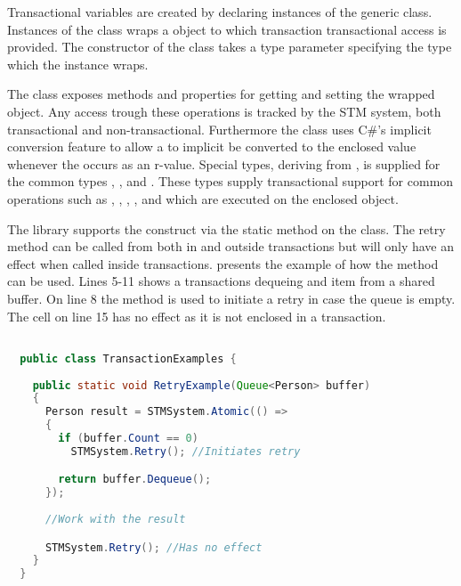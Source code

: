Transactional variables are created by declaring instances of the generic  class. Instances of the  class wraps a object to which transaction transactional access is provided.  The constructor of the  class takes a type parameter specifying the type which the  instance wraps.

The  class exposes methods and properties for getting and setting the wrapped object. Any access trough these operations is tracked by the \ac{STM} system, both transactional and non-transactional. Furthermore the  class uses C\#'s implicit conversion feature to allow a  to implicit be converted to the enclosed value whenever the  occurs as an r-value. Special types, deriving from , is supplied for the common types , ,  and . These types supply transactional support for common operations such as \bscode{+}, \bscode{-}, \bscode{*}, \bscode{/}, \bscode{++} and \bscode{--} which are executed on the enclosed object.

The library supports the  construct via the static  method on the  class. The retry method can be called from both in and outside transactions but will only have an effect when called inside transactions.  presents the example of how the  method can be used. Lines 5-11 shows a transactions dequeing and item from a shared buffer. On line 8 the  method is used to initiate a retry in case the queue is empty. The cell on line 15 has no effect as it is not enclosed in a transaction.

\begin{lstlisting}[label=lst:library_retry,
  caption={Library \bscode{Retry}},
  language=Java,  
  showspaces=false,
  showtabs=false,
  breaklines=true,
  showstringspaces=false,
  breakatwhitespace=true,
  commentstyle=\color{greencomments},
  keywordstyle=\color{bluekeywords},
  stringstyle=\color{redstrings},
  morekeywords={atomic, retry, orElse, var, get, set}]  % Start your code-block

  public class TransactionExamples {
    
    public static void RetryExample(Queue<Person> buffer)
    {
      Person result = STMSystem.Atomic(() =>
      {
        if (buffer.Count == 0)
          STMSystem.Retry(); //Initiates retry

        return buffer.Dequeue();
      });
      
      //Work with the result

      STMSystem.Retry(); //Has no effect
    }
  }
\end{lstlisting}


